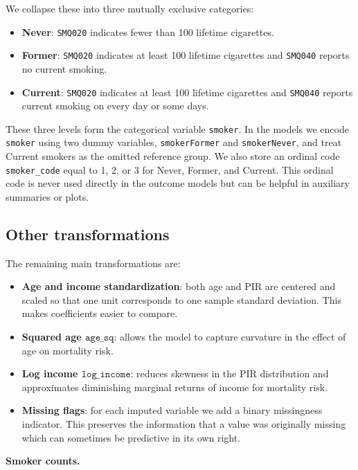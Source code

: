 \documentclass{article}
\begin{document}
We collapse these into three mutually exclusive categories:

\begin{itemize}
  \item \textbf{Never}: \texttt{SMQ020} indicates fewer than 100 lifetime cigarettes.
  \item \textbf{Former}: \texttt{SMQ020} indicates at least 100 lifetime cigarettes and \texttt{SMQ040} reports no current smoking.
  \item \textbf{Current}: \texttt{SMQ020} indicates at least 100 lifetime cigarettes and \texttt{SMQ040} reports current smoking on every day or some days.
\end{itemize}

These three levels form the categorical variable \texttt{smoker}. In the models we encode \texttt{smoker} using two dummy variables, \texttt{smokerFormer} and \texttt{smokerNever}, and treat Current smokers as the omitted reference group. We also store an ordinal code \texttt{smoker\_code} equal to 1, 2, or 3 for Never, Former, and Current. This ordinal code is never used directly in the outcome models but can be helpful in auxiliary summaries or plots.

\subsection*{Other transformations}

The remaining main transformations are:

\begin{itemize}
  \item \textbf{Age and income standardization}: both age and PIR are centered and scaled so that one unit corresponds to one sample standard deviation. This makes coefficients easier to compare.
  \item \textbf{Squared age \(\texttt{age\_sq}\)}: allows the model to capture curvature in the effect of age on mortality risk.
  \item \textbf{Log income \(\texttt{log\_income}\)}: reduces skewness in the PIR distribution and approximates diminishing marginal returns of income for mortality risk.
  \item \textbf{Missing flags}: for each imputed variable we add a binary missingness indicator. This preserves the information that a value was originally missing which can sometimes be predictive in its own right.
\end{itemize}

\noindent\textbf{Smoker counts.}
\par

\end{document}
